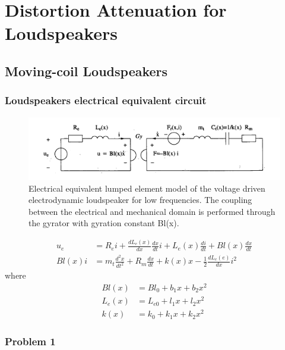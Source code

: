 \documentclass[12pt,a4paper,fleqn, onesside]{report}
\begin{document}
\pagebreak
{}
\setcounter{page}{1}
\setcounter{tocdepth}{4}
\setcounter{secnumdepth}{4} 
\tableofcontents
\newpage
{}
\def\chaptername{Exercice}


\chapter{Distortion Attenuation for Loudspeakers}
\section{Moving-coil Loudspeakers}
\subsection{Loudspeakers electrical equivalent circuit}

\begin{figure}[H]
\includegraphics[scale=.6]{figures/circuit.png}
\caption{Electrical equivalent lumped element model of the voltage driven electrodynamic loudspeaker for low frequencies. The coupling between the electrical and mechanical domain is performed through the gyrator with gyration constant Bl(x).}
\label{circuit}
\end{figure}

\begin{align} 
  u_e &= R_ei+\frac{dL_e(x)}{dx}\frac{dx}{dt}i+L_e(x)\frac{di}{dt}+Bl(x)\frac{dx}{dt} \label{eq:1.1} \\     
  Bl(x)i &= m_t\frac{d^2x}{dt^2}+R_m\frac{dx}{dt}+k(x)x-\frac{1}{2}\frac{dL_e(e)}{dx}i^2 \label{eq:1.2}
\end{align}
where
\begin{align}
  Bl(x) &= Bl_0+b_1x+b_2x^2 \label{eq:1.3}  \\
  L_e(x) &= L_{e0}+l_1x+l_2x^2 \label{eq:1.4}  \\
  k(x) &= k_0+k_1x+k_2x^2 \label{eq:1.5} 
\end{align}

\subsection*{Problem 1}

\end{document}
